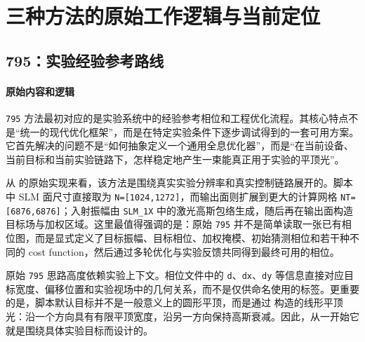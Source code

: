 \documentclass[12pt,a4paper]{ctexart}
\begin{document}
\section{三种方法的原始工作逻辑与当前定位}

\subsection{795：实验经验参考路线}
\paragraph{原始内容和逻辑}
\texttt{795} 方法最初对应的是实验系统中的经验参考相位和工程优化流程。其核心特点不是“统一的现代优化框架”，而是在特定实验条件下逐步调试得到的一套可用方案。它首先解决的问题不是“如何抽象定义一个通用全息优化器”，而是“在当前设备、当前目标和当前实验链路下，怎样稳定地产生一束能真正用于实验的平顶光”。

从  的原始实现来看，该方法是围绕真实实验分辨率和真实控制链路展开的。脚本中 SLM 面尺寸直接取为 \texttt{N=[1024,1272]}，而输出面则扩展到更大的计算网格 \texttt{NT=[6876,6876]}；入射振幅由 \texttt{SLM\_1X} 中的激光高斯包络生成，随后再在输出面构造目标场与加权区域。这里最值得强调的是：原始 \texttt{795} 并不是简单读取一张已有相位图，而是显式定义了目标振幅、目标相位、加权掩模、初始猜测相位和若干种不同的 cost function，然后通过多轮优化与实验反馈共同得到最终可用的相位。

原始 \texttt{795} 思路高度依赖实验上下文。相位文件中的 \texttt{d}、\texttt{dx}、\texttt{dy} 等信息直接对应目标宽度、偏移位置和实验视场中的几何关系，而不是仅供命名使用的标签。更重要的是，脚本默认目标并不是一般意义上的圆形平顶，而是通过  构造的线形平顶光：沿一个方向具有有限平顶宽度，沿另一方向保持高斯衰减。因此，从一开始它就是围绕具体实验目标而设计的。
\end{document}
